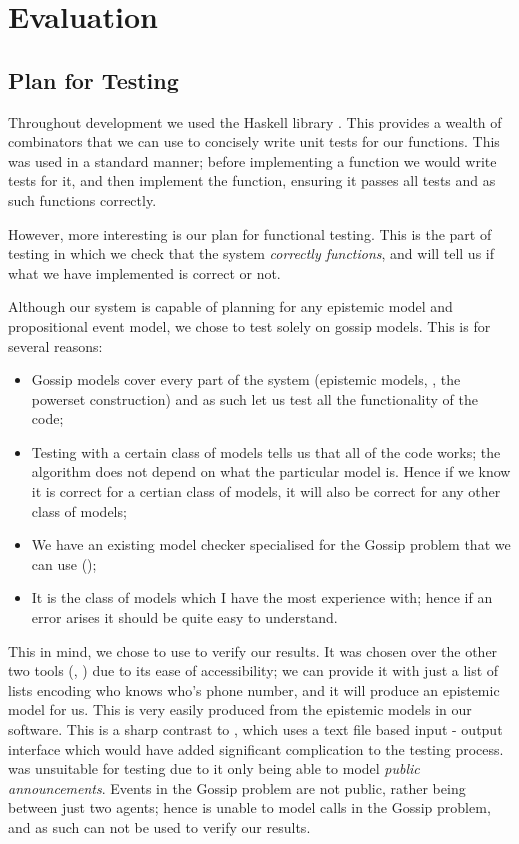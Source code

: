 \documentclass[10pt, a4paper]{report}
\begin{document}
\newpage

\chapter{Evaluation}

\section{Plan for Testing}

Throughout development we used the Haskell library . This provides
a wealth of combinators that we can use to concisely write unit tests for our
functions. This was used in a standard manner; before implementing a function we
would write tests for it, and then implement the function, ensuring it passes
all tests and as such functions correctly.

However, more interesting is our plan for functional testing. This is the part
of testing in which we check that the system \emph{correctly functions}, and
will tell us if what we have implemented is correct or not.

Although our system is capable of planning for any epistemic model and
propositional event model, we chose to test solely on gossip models. This is
for several reasons:

\begin{itemize}
\item Gossip models cover every part of the system (epistemic models, \mestar,
  the powerset construction) and as such let us test all the functionality of
  the code;
\item Testing with a certain class of models tells us that all of the code
  works; the algorithm does not depend on what the particular model is. Hence if
  we know it is correct for a certian class of models, it will also be correct
  for any other class of models;
\item We have an existing model checker specialised for the Gossip problem that we can use
  (\cite{GithubGossip});
\item It is the class of models which I have the most experience with; hence if
  an error arises it should be quite easy to understand.
\end{itemize}

This in mind, we chose to use \cite{GithubGossip} to verify our results. It was
chosen over the other two tools (\cite{SMCDEL}, \cite{DEMO-S5}) due to its ease
of accessibility; we can provide it with just a list of lists encoding who knows
who's phone number, and it will produce an epistemic model for us. This is very
easily produced from the epistemic models in our software. This is a sharp
contrast to \cite{SMCDEL}, which uses a text file based input - output interface
which would have added significant complication to the testing process.
\cite{DEMO-S5} was unsuitable for testing due to it only being able to model
\emph{public announcements}. Events in the Gossip problem are not public, rather
being between just two agents; hence \cite{DEMO-S5} is unable to model calls in
the Gossip problem, and as such can not be used to verify our results.
\end{document}
